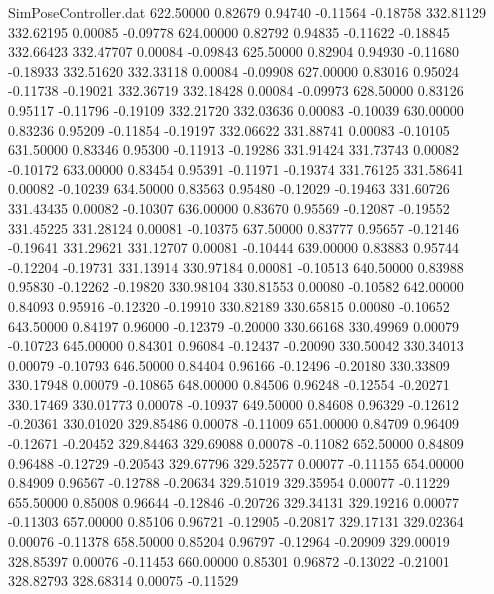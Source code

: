 \begin{filecontents}{SimPoseController.dat}
 622.50000    0.82679    0.94740    -0.11564   -0.18758  332.81129  332.62195    0.00085   -0.09778
 624.00000    0.82792    0.94835    -0.11622   -0.18845  332.66423  332.47707    0.00084   -0.09843
 625.50000    0.82904    0.94930    -0.11680   -0.18933  332.51620  332.33118    0.00084   -0.09908
 627.00000    0.83016    0.95024    -0.11738   -0.19021  332.36719  332.18428    0.00084   -0.09973
 628.50000    0.83126    0.95117    -0.11796   -0.19109  332.21720  332.03636    0.00083   -0.10039
 630.00000    0.83236    0.95209    -0.11854   -0.19197  332.06622  331.88741    0.00083   -0.10105
 631.50000    0.83346    0.95300    -0.11913   -0.19286  331.91424  331.73743    0.00082   -0.10172
 633.00000    0.83454    0.95391    -0.11971   -0.19374  331.76125  331.58641    0.00082   -0.10239
 634.50000    0.83563    0.95480    -0.12029   -0.19463  331.60726  331.43435    0.00082   -0.10307
 636.00000    0.83670    0.95569    -0.12087   -0.19552  331.45225  331.28124    0.00081   -0.10375
 637.50000    0.83777    0.95657    -0.12146   -0.19641  331.29621  331.12707    0.00081   -0.10444
 639.00000    0.83883    0.95744    -0.12204   -0.19731  331.13914  330.97184    0.00081   -0.10513
 640.50000    0.83988    0.95830    -0.12262   -0.19820  330.98104  330.81553    0.00080   -0.10582
 642.00000    0.84093    0.95916    -0.12320   -0.19910  330.82189  330.65815    0.00080   -0.10652
 643.50000    0.84197    0.96000    -0.12379   -0.20000  330.66168  330.49969    0.00079   -0.10723
 645.00000    0.84301    0.96084    -0.12437   -0.20090  330.50042  330.34013    0.00079   -0.10793
 646.50000    0.84404    0.96166    -0.12496   -0.20180  330.33809  330.17948    0.00079   -0.10865
 648.00000    0.84506    0.96248    -0.12554   -0.20271  330.17469  330.01773    0.00078   -0.10937
 649.50000    0.84608    0.96329    -0.12612   -0.20361  330.01020  329.85486    0.00078   -0.11009
 651.00000    0.84709    0.96409    -0.12671   -0.20452  329.84463  329.69088    0.00078   -0.11082
 652.50000    0.84809    0.96488    -0.12729   -0.20543  329.67796  329.52577    0.00077   -0.11155
 654.00000    0.84909    0.96567    -0.12788   -0.20634  329.51019  329.35954    0.00077   -0.11229
 655.50000    0.85008    0.96644    -0.12846   -0.20726  329.34131  329.19216    0.00077   -0.11303
 657.00000    0.85106    0.96721    -0.12905   -0.20817  329.17131  329.02364    0.00076   -0.11378
 658.50000    0.85204    0.96797    -0.12964   -0.20909  329.00019  328.85397    0.00076   -0.11453
 660.00000    0.85301    0.96872    -0.13022   -0.21001  328.82793  328.68314    0.00075   -0.11529

\end{filecontents}
